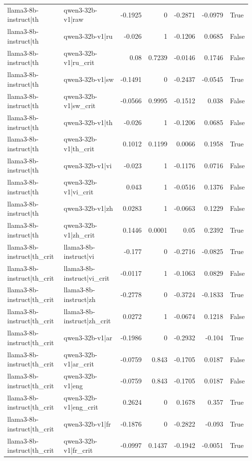 \begin{table}
\begin{tabular}{l l r r r r l}
llama3-8b-instruct|th & qwen3-32b-v1|raw & -0.1925 & 0 & -0.2871 & -0.0979 & True \\
llama3-8b-instruct|th & qwen3-32b-v1|ru & -0.026 & 1 & -0.1206 & 0.0685 & False \\
llama3-8b-instruct|th & qwen3-32b-v1|ru_crit & 0.08 & 0.7239 & -0.0146 & 0.1746 & False \\
llama3-8b-instruct|th & qwen3-32b-v1|sw & -0.1491 & 0 & -0.2437 & -0.0545 & True \\
llama3-8b-instruct|th & qwen3-32b-v1|sw_crit & -0.0566 & 0.9995 & -0.1512 & 0.038 & False \\
llama3-8b-instruct|th & qwen3-32b-v1|th & -0.026 & 1 & -0.1206 & 0.0685 & False \\
llama3-8b-instruct|th & qwen3-32b-v1|th_crit & 0.1012 & 0.1199 & 0.0066 & 0.1958 & True \\
llama3-8b-instruct|th & qwen3-32b-v1|vi & -0.023 & 1 & -0.1176 & 0.0716 & False \\
llama3-8b-instruct|th & qwen3-32b-v1|vi_crit & 0.043 & 1 & -0.0516 & 0.1376 & False \\
llama3-8b-instruct|th & qwen3-32b-v1|zh & 0.0283 & 1 & -0.0663 & 0.1229 & False \\
llama3-8b-instruct|th & qwen3-32b-v1|zh_crit & 0.1446 & 0.0001 & 0.05 & 0.2392 & True \\
llama3-8b-instruct|th_crit & llama3-8b-instruct|vi & -0.177 & 0 & -0.2716 & -0.0825 & True \\
llama3-8b-instruct|th_crit & llama3-8b-instruct|vi_crit & -0.0117 & 1 & -0.1063 & 0.0829 & False \\
llama3-8b-instruct|th_crit & llama3-8b-instruct|zh & -0.2778 & 0 & -0.3724 & -0.1833 & True \\
llama3-8b-instruct|th_crit & llama3-8b-instruct|zh_crit & 0.0272 & 1 & -0.0674 & 0.1218 & False \\
llama3-8b-instruct|th_crit & qwen3-32b-v1|ar & -0.1986 & 0 & -0.2932 & -0.104 & True \\
llama3-8b-instruct|th_crit & qwen3-32b-v1|ar_crit & -0.0759 & 0.843 & -0.1705 & 0.0187 & False \\
llama3-8b-instruct|th_crit & qwen3-32b-v1|eng & -0.0759 & 0.843 & -0.1705 & 0.0187 & False \\
llama3-8b-instruct|th_crit & qwen3-32b-v1|eng_crit & 0.2624 & 0 & 0.1678 & 0.357 & True \\
llama3-8b-instruct|th_crit & qwen3-32b-v1|fr & -0.1876 & 0 & -0.2822 & -0.093 & True \\
llama3-8b-instruct|th_crit & qwen3-32b-v1|fr_crit & -0.0997 & 0.1437 & -0.1942 & -0.0051 & True \\

\end{tabular}
\end{table}
